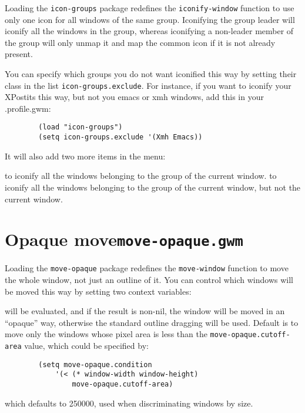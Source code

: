 Loading the {\tt icon-groups} package redefines the {\tt iconify-window}
function to use only one icon for all windows of the same group. Iconifying
the group leader will iconify all the windows in the group, whereas
iconifying a non-leader member of the group will only unmap it and map the
common icon if it is not already present.

You can specify which groups you do not want iconified this way by setting
their class in the list \verb|icon-groups.exclude|. For instance, if you want
to iconify your XPostits this way, but not you emacs or xmh windows, add this
in your .profile.gwm:

{\exemplefont\begin{verbatim}
        (load "icon-groups")
        (setq icon-groups.exclude '(Xmh Emacs))
\end{verbatim}}

It will also add two more items in the menu:
\begin{description}
 to iconify all the windows belonging to the group of the
current window.
 to iconify all the windows belonging to the group of 
the current window, but not the current window.
\end{description}

\section{Opaque move\hfill{\tt move-opaque.gwm}}
\label{move-opaque}

Loading the {\tt move-opaque} package redefines the {\tt move-window} function
to move the whole window, not just an outline of it. You can control which
windows will be moved this way by setting two context variables:

\begin{description}
 will be evaluated, and if the result is
non-nil, the window will be moved in an ``opaque'' way, otherwise the standard
outline dragging will be used. Default is to move only the windows whose pixel
area is less than the \verb"move-opaque.cutoff-area" value, which could be
specified by:
{\exemplefont\begin{verbatim}
        (setq move-opaque.condition
            '(< (* window-width window-height) 
                move-opaque.cutoff-area)
\end{verbatim}}
 which defaults to 250000, used when
discriminating windows by size.
\end{description}       

